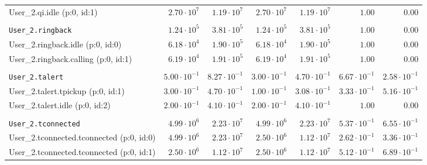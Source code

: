 \begin{table}[htbp]
{\begin{tabular}{lrrrrrr}
\hspace{3mm}User\_2.qi.idle (p:0, id:1)               &  $2.70 \cdot 10^{7}$ &  $1.19 \cdot 10^{7}$ &  $2.70 \cdot 10^{7}$ &  $1.19 \cdot 10^{7}$ &               $1.00$ &               $0.00$ \\
\\[-8pt]\texttt{User\_2.ringback}                     &  $1.24 \cdot 10^{5}$ &  $3.81 \cdot 10^{5}$ &  $1.24 \cdot 10^{5}$ &  $3.81 \cdot 10^{5}$ &               $1.00$ &               $0.00$ \\
\hspace{3mm}User\_2.ringback.idle (p:0, id:0)         &  $6.18 \cdot 10^{4}$ &  $1.90 \cdot 10^{5}$ &  $6.18 \cdot 10^{4}$ &  $1.90 \cdot 10^{5}$ &               $1.00$ &               $0.00$ \\
\hspace{3mm}User\_2.ringback.calling (p:0, id:1)      &  $6.19 \cdot 10^{4}$ &  $1.91 \cdot 10^{5}$ &  $6.19 \cdot 10^{4}$ &  $1.91 \cdot 10^{5}$ &               $1.00$ &               $0.00$ \\
\\[-8pt]\texttt{User\_2.talert}                       & $5.00 \cdot 10^{-1}$ & $8.27 \cdot 10^{-1}$ & $3.00 \cdot 10^{-1}$ & $4.70 \cdot 10^{-1}$ & $6.67 \cdot 10^{-1}$ & $2.58 \cdot 10^{-1}$ \\
\hspace{3mm}User\_2.talert.tpickup (p:0, id:1)        & $3.00 \cdot 10^{-1}$ & $4.70 \cdot 10^{-1}$ & $1.00 \cdot 10^{-1}$ & $3.08 \cdot 10^{-1}$ & $3.33 \cdot 10^{-1}$ & $5.16 \cdot 10^{-1}$ \\
\hspace{3mm}User\_2.talert.idle (p:0, id:2)           & $2.00 \cdot 10^{-1}$ & $4.10 \cdot 10^{-1}$ & $2.00 \cdot 10^{-1}$ & $4.10 \cdot 10^{-1}$ &               $1.00$ &               $0.00$ \\
\\[-8pt]\texttt{User\_2.tconnected}                   &  $4.99 \cdot 10^{6}$ &  $2.23 \cdot 10^{7}$ &  $4.99 \cdot 10^{6}$ &  $2.23 \cdot 10^{7}$ & $5.37 \cdot 10^{-1}$ & $6.55 \cdot 10^{-1}$ \\
\hspace{3mm}User\_2.tconnected.tconnected (p:0, id:0) &  $4.99 \cdot 10^{6}$ &  $2.23 \cdot 10^{7}$ &  $2.50 \cdot 10^{6}$ &  $1.12 \cdot 10^{7}$ & $2.62 \cdot 10^{-1}$ & $3.36 \cdot 10^{-1}$ \\
\hspace{3mm}User\_2.tconnected.tconnected (p:0, id:1) &  $2.50 \cdot 10^{6}$ &  $1.12 \cdot 10^{7}$ &  $2.50 \cdot 10^{6}$ &  $1.12 \cdot 10^{7}$ & $5.12 \cdot 10^{-1}$ & $6.89 \cdot 10^{-1}$ \\

\end{tabular}}
\end{table}
